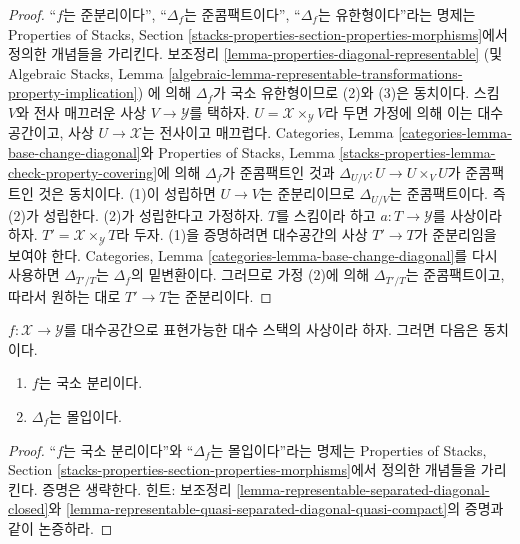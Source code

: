 \begin{proof}
``$f$는 준분리이다'', ``$\Delta_f$는 준콤팩트이다'',
``$\Delta_f$는 유한형이다''라는 명제는 Properties of Stacks,
Section \ref{stacks-properties-section-properties-morphisms}에서
정의한 개념들을 가리킨다. 보조정리
\ref{lemma-properties-diagonal-representable}
(및 Algebraic Stacks, Lemma
\ref{algebraic-lemma-representable-transformations-property-implication})
에 의해 $\Delta_f$가 국소 유한형이므로 (2)와 (3)은 동치이다.
스킴 $V$와 전사 매끄러운 사상 $V \to \mathcal{Y}$를 택하자.
$U = \mathcal{X} \times_\mathcal{Y} V$라 두면 가정에 의해 이는
대수공간이고, 사상 $U \to \mathcal{X}$는 전사이고 매끄럽다.
Categories, Lemma \ref{categories-lemma-base-change-diagonal}와
Properties of Stacks, Lemma
\ref{stacks-properties-lemma-check-property-covering}에 의해
$\Delta_f$가 준콤팩트인 것과
$\Delta_{U/V} : U \to U \times_V U$가 준콤팩트인 것은 동치이다.
(1)이 성립하면 $U \to V$는 준분리이므로
$\Delta_{U/V}$는 준콤팩트이다. 즉 (2)가 성립한다.
(2)가 성립한다고 가정하자. $T$를 스킴이라 하고
$a : T \to \mathcal{Y}$를 사상이라 하자.
$T' = \mathcal{X} \times_\mathcal{Y} T$라 두자.
(1)을 증명하려면 대수공간의 사상 $T' \to T$가 준분리임을 보여야 한다.
Categories, Lemma \ref{categories-lemma-base-change-diagonal}를
다시 사용하면 $\Delta_{T'/T}$는 $\Delta_f$의 밑변환이다.
그러므로 가정 (2)에 의해 $\Delta_{T'/T}$는 준콤팩트이고,
따라서 원하는 대로 $T' \to T$는 준분리이다.
\end{proof}

\begin{lemma}
\label{lemma-representable-locally-separated-diagonal-immersion}
$f : \mathcal{X} \to \mathcal{Y}$를 대수공간으로 표현가능한
대수 스택의 사상이라 하자. 그러면 다음은 동치이다.
\begin{enumerate}
\item $f$는 국소 분리이다.
\item $\Delta_f$는 몰입이다.
\end{enumerate}
\end{lemma}

\begin{proof}
``$f$는 국소 분리이다''와 ``$\Delta_f$는 몰입이다''라는 명제는
Properties of Stacks, Section
\ref{stacks-properties-section-properties-morphisms}에서 정의한
개념들을 가리킨다. 증명은 생략한다. 힌트: 보조정리
\ref{lemma-representable-separated-diagonal-closed}와
\ref{lemma-representable-quasi-separated-diagonal-quasi-compact}의
증명과 같이 논증하라.
\end{proof}






